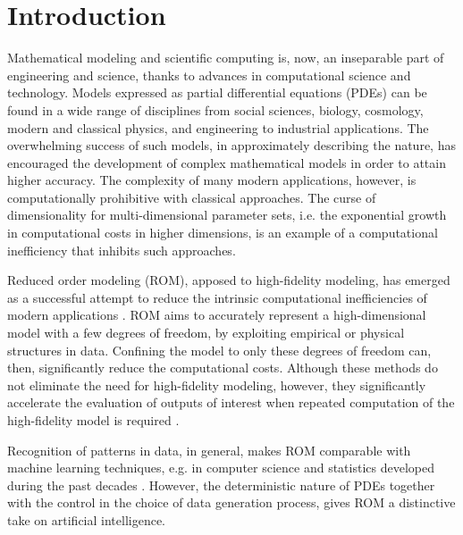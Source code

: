 \chapter*{Introduction}
Mathematical modeling and scientific computing is, now, an inseparable part of engineering and science, thanks to advances in computational science and technology. Models expressed as partial differential equations (PDEs) can be found in a wide range of disciplines from social sciences, biology, cosmology, modern and classical physics, and engineering to industrial applications. The overwhelming success of such models, in approximately describing the nature, has encouraged the development of complex mathematical models in order to attain higher accuracy. The complexity of many modern applications, however, is computationally prohibitive with classical approaches. The curse of dimensionality for multi-dimensional parameter sets, i.e. the exponential growth in computational costs in higher dimensions, is an example of a computational inefficiency that inhibits such approaches.

Reduced order modeling (ROM), apposed to high-fidelity modeling, has emerged as a successful attempt to reduce the intrinsic computational inefficiencies of modern applications \cite{hesthaven2015certified,quarteroni2015reduced,doi:10.1137/1.9781611974829,doi:10.1137/1.9780898718713}. ROM aims to accurately represent a high-dimensional model with a few degrees of freedom, by exploiting empirical or physical structures in data. Confining the model to only these degrees of freedom can, then, significantly reduce the computational costs. Although these methods do not eliminate the need for high-fidelity modeling, however, they significantly accelerate the evaluation of outputs of interest when repeated computation of the high-fidelity model is required \cite{hesthaven2015certified}.


Recognition of patterns in data, in general, makes ROM comparable with machine learning techniques, e.g. in computer science and statistics developed during the past decades \cite{machinelearning}. However, the deterministic nature of PDEs together with the control in the choice of data generation process, gives ROM a distinctive take on artificial intelligence. 

